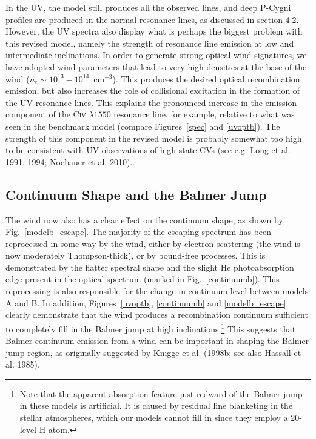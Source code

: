\documentclass[preprint, a4paper, 11pt]{aastex}
\begin{document}
In the UV, the model still produces all the observed lines, 
and deep P-Cygni profiles are produced in the normal resonance lines,
as discussed in section 4.2. However, the UV spectra also
display what is perhaps the biggest problem with this revised model,
namely the strength of resonance line emission 
at low and intermediate inclinations.
In order to generate strong optical wind signatures, we have adopted wind
parameters that lead to very high densities at the base of the wind
($n_e\sim10^{13}-10^{14}$~cm$^{-3}$). This produces
the desired optical recombination emission, but also increases the
role of collisional excitation in the formation of the UV resonance
lines. This explains the pronounced increase in the emission component 
of the C\textsc{iv} $\lambda1550$ resonance line, for example, relative to
what was seen in the benchmark model (compare Figures~\ref{spec} and
\ref{uvoptb}). The strength of this component in the revised model 
is probably somewhat too high to be consistent with UV observations 
of high-state CVs (see e.g. Long et al. 1991, 1994; Noebauer et al. 2010).
\nocite{long1991,long1994, noebauer}

\subsection{Continuum Shape and the Balmer Jump}

The wind now also has a clear effect on the continuum shape,
as shown by Fig.~\ref{modelb_escape}. The majority of the
escaping spectrum has been reprocessed in some way by the wind,
either by electron scattering (the wind is now moderately Thompson-thick),
or by bound-free processes. This is demonstrated by the flatter spectral shape
and the slight He photoabsorption edge present in the optical spectrum 
(marked in Fig.~\ref{continuumb}). This reprocessing is also
responsible for the change in continuum level between models A and B.
In addition, Figures~\ref{uvoptb}, \ref{continuumb} 
and \ref{modelb_escape} clearly demonstrate that the wind produces
a recombination continuum sufficient to completely fill in the Balmer jump
at high inclinations.\footnote{Note that the apparent absorption feature 
just redward of the Balmer jump in these models is artificial. It is
caused by residual line blanketing in the stellar atmospheres, which
our models cannot fill in since they employ a 20-level H atom.}
This suggests that Balmer continuum emission from a wind can be important 
in shaping the Balmer jump region, as
originally suggested by Knigge et al.
(1998b; see also Hassall et al. 1985)\nocite{KLWB98,hassall}. 
\end{document}
